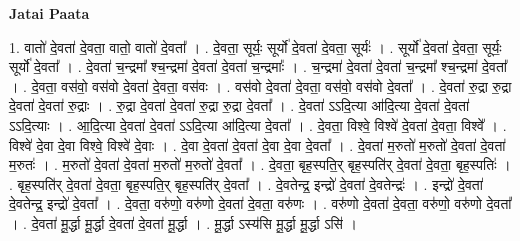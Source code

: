 \documentclass[17pt]{extarticle}
\begin{document}
\textbf{Jatai Paata} \newline

1. वातो॑ दे॒वता॑ दे॒वता॒ वातो॒ वातो॑ दे॒वता᳚ । . दे॒वता॒ सूर्यः॒ सूर्यो॑ दे॒वता॑ दे॒वता॒ सूर्यः॑ । . सूर्यो॑ दे॒वता॑ दे॒वता॒ सूर्यः॒ सूर्यो॑ दे॒वता᳚ । . दे॒वता॑ च॒न्द्रमा᳚ श्च॒न्द्रमा॑ दे॒वता॑ दे॒वता॑ च॒न्द्रमाः᳚ । . च॒न्द्रमा॑ दे॒वता॑ दे॒वता॑ च॒न्द्रमा᳚ श्च॒न्द्रमा॑ दे॒वता᳚ । . दे॒वता॒ वस॑वो॒ वस॑वो दे॒वता॑ दे॒वता॒ वस॑वः । . वस॑वो दे॒वता॑ दे॒वता॒ वस॑वो॒ वस॑वो दे॒वता᳚ । . दे॒वता॑ रु॒द्रा रु॒द्रा दे॒वता॑ दे॒वता॑ रु॒द्राः । . रु॒द्रा दे॒वता॑ दे॒वता॑ रु॒द्रा रु॒द्रा दे॒वता᳚ । . दे॒वता॑ ऽऽदि॒त्या आ॑दि॒त्या दे॒वता॑ दे॒वता॑ ऽऽदि॒त्याः । . आ॒दि॒त्या दे॒वता॑ दे॒वता॑ ऽऽदि॒त्या आ॑दि॒त्या दे॒वता᳚ । . दे॒वता॒ विश्वे॒ विश्वे॑ दे॒वता॑ दे॒वता॒ विश्वे᳚ । . विश्वे॑ दे॒वा दे॒वा विश्वे॒ विश्वे॑ दे॒वाः । . दे॒वा दे॒वता॑ दे॒वता॑ दे॒वा दे॒वा दे॒वता᳚ । . दे॒वता॑ म॒रुतो॑ म॒रुतो॑ दे॒वता॑ दे॒वता॑ म॒रुतः॑ । . म॒रुतो॑ दे॒वता॑ दे॒वता॑ म॒रुतो॑ म॒रुतो॑ दे॒वता᳚ । . दे॒वता॒ बृह॒स्पति॒र् बृह॒स्पति॑र् दे॒वता॑ दे॒वता॒ बृह॒स्पतिः॑ । . बृह॒स्पति॑र् दे॒वता॑ दे॒वता॒ बृह॒स्पति॒र् बृह॒स्पति॑र् दे॒वता᳚ । . दे॒वतेन्द्र॒ इन्द्रो॑ दे॒वता॑ दे॒वतेन्द्रः॑ । . इन्द्रो॑ दे॒वता॑ दे॒वतेन्द्र॒ इन्द्रो॑ दे॒वता᳚ । . दे॒वता॒ वरु॑णो॒ वरु॑णो दे॒वता॑ दे॒वता॒ वरु॑णः । . वरु॑णो दे॒वता॑ दे॒वता॒ वरु॑णो॒ वरु॑णो दे॒वता᳚ । . दे॒वता॑ मू॒र्द्धा मू॒र्द्धा दे॒वता॑ दे॒वता॑ मू॒र्द्धा । . मू॒र्द्धा ऽस्य॑सि मू॒र्द्धा मू॒र्द्धा ऽसि॑ । \newline
\end{document}
